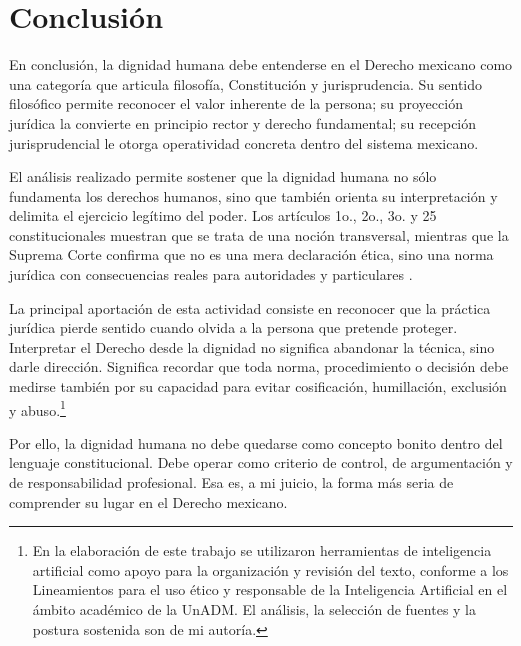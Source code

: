 \documentclass[
	spanish,
	letterpaper, oneside
]{article}
\begin{document}
\section{Conclusión}

En conclusión, la dignidad humana debe entenderse en el Derecho mexicano como una categoría que articula filosofía, Constitución y jurisprudencia. Su sentido filosófico permite reconocer el valor inherente de la persona; su proyección jurídica la convierte en principio rector y derecho fundamental; su recepción jurisprudencial le otorga operatividad concreta dentro del sistema mexicano.

El análisis realizado permite sostener que la dignidad humana no sólo fundamenta los derechos humanos, sino que también orienta su interpretación y delimita el ejercicio legítimo del poder. Los artículos 1o., 2o., 3o. y 25 constitucionales muestran que se trata de una noción transversal, mientras que la Suprema Corte confirma que no es una mera declaración ética, sino una norma jurídica con consecuencias reales para autoridades y particulares \citep{constitucionCPEUM2026,scjnJur37_2016}.

La principal aportación de esta actividad consiste en reconocer que la práctica jurídica pierde sentido cuando olvida a la persona que pretende proteger. Interpretar el Derecho desde la dignidad no significa abandonar la técnica, sino darle dirección. Significa recordar que toda norma, procedimiento o decisión debe medirse también por su capacidad para evitar cosificación, humillación, exclusión y abuso.\footnote{En la elaboración de este trabajo se utilizaron herramientas de inteligencia artificial como apoyo para la organización y revisión del texto, conforme a los Lineamientos para el uso ético y responsable de la Inteligencia Artificial en el ámbito académico de la UnADM. El análisis, la selección de fuentes y la postura sostenida son de mi autoría.}

Por ello, la dignidad humana no debe quedarse como concepto bonito dentro del lenguaje constitucional. Debe operar como criterio de control, de argumentación y de responsabilidad profesional. Esa es, a mi juicio, la forma más seria de comprender su lugar en el Derecho mexicano.%
% 
\end{document}
